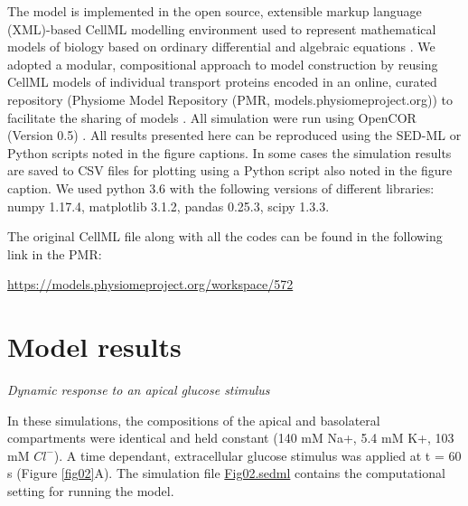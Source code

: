 \documentclass[fleqn,10pt]{physiome}
\begin{document}
The model is implemented in the open source, extensible markup language
(XML)-based CellML modelling environment used to represent mathematical
models of biology based on ordinary differential and algebraic equations \citep{cuellar2003overview}. We adopted a modular, compositional approach to model
construction by reusing CellML models of individual transport proteins encoded
in an online, curated repository (Physiome Model Repository (PMR,
models.physiomeproject.org)) to facilitate the sharing of models \citep{yu2011physiome}. All simulation were run using OpenCOR (Version 0.5) \citep{garny2015opencor}.
All results presented here can be reproduced using the SED-ML or Python scripts noted in the figure captions. In some cases the simulation results are saved to CSV files for plotting using a Python script also noted in the figure caption. We used python 3.6 with the following versions of different libraries: numpy 1.17.4, matplotlib 3.1.2, pandas 0.25.3, scipy 1.3.3.

The original CellML file along with all the codes can be found in the following link in the PMR:\newline

\url{https://models.physiomeproject.org/workspace/572}\newline\newline

\section{Model results}
\textit{Dynamic response to an apical glucose stimulus}\newline

In these simulations, the compositions of the apical and basolateral compartments were identical
and held constant (140 mM Na+, 5.4 mM K+, 103 mM ${Cl^-}$). A time dependant, extracellular glucose stimulus was applied at t = 60 s (Figure \ref{fig02}A). The simulation file \href{https://models.physiomeproject.org/workspace/572/file/057757b3a8de9a56b4bd32b8a12a0f00af1d8213/SEDML_files/Fig02.sedml}{Fig02.sedml} contains the computational setting for running the model.\newline
\end{document}
